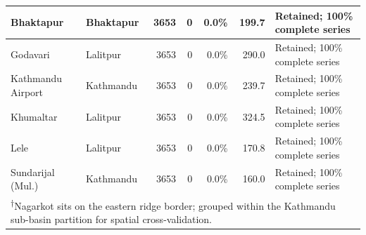 \documentclass[conference]{IEEEtran}
\begin{document}
\begin{table}[!t]
{\begin{tabular}{|l|l|r|r|r|r|p{5.5cm}|}
Bhaktapur & Bhaktapur & 3653 & 0 & 0.0\% & 199.7 & Retained; 100\% complete series \\ \hline
Godavari & Lalitpur & 3653 & 0 & 0.0\% & 290.0 & Retained; 100\% complete series \\ \hline
Kathmandu Airport & Kathmandu & 3653 & 0 & 0.0\% & 239.7 & Retained; 100\% complete series \\ \hline
Khumaltar & Lalitpur & 3653 & 0 & 0.0\% & 324.5 & Retained; 100\% complete series \\ \hline
Lele & Lalitpur & 3653 & 0 & 0.0\% & 170.8 & Retained; 100\% complete series \\ \hline
Sundarijal (Mul.) & Kathmandu & 3653 & 0 & 0.0\% & 160.0 & Retained; 100\% complete series \\
\hline
\multicolumn{7}{|l|}{\scriptsize \textsuperscript{$\dagger$}Nagarkot sits on the eastern ridge border; grouped within the Kathmandu sub-basin partition for spatial cross-validation.} \\
\hline
\end{tabular}%
}
\end{table}
\end{document}
